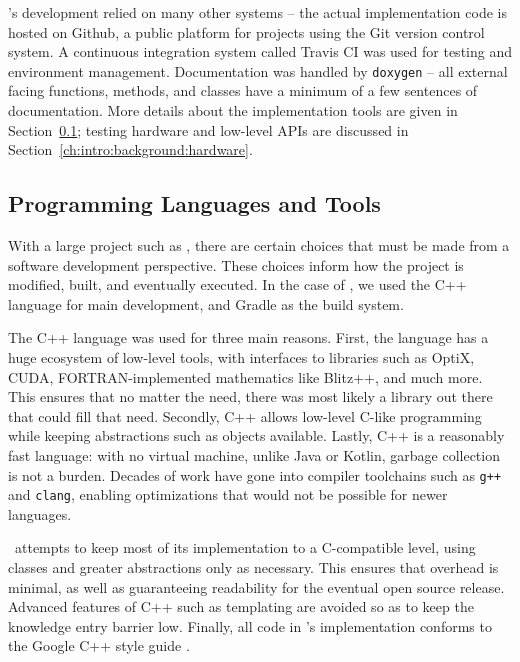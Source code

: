 \name's development relied on many other systems -- the actual implementation code is hosted on Github, a public platform for projects using the Git version control system.
A continuous integration system called Travis CI \cite{travisci} was used for testing and environment management.
Documentation was handled by \texttt{doxygen} \cite{van2008doxygen} -- all external facing functions, methods, and classes have a minimum of a few sentences of documentation.
More details about the implementation tools are given in Section~\ref{ch:intro:background:languages_and_libraries}; testing hardware and low-level APIs are discussed in Section~\ref{ch:intro:background:hardware}.

\subsection{Programming Languages and Tools}
\label{ch:intro:background:languages_and_libraries}

With a large project such as \name, there are certain choices that must be made from a software development perspective.
These choices inform how the project is modified, built, and eventually executed.
In the case of \name, we used the C++ language \cite{cpp14standard} for main development, and Gradle \cite{gradle} as the build system.


The C++ language was used for three main reasons.
First, the language has a huge ecosystem of low-level tools, with interfaces to libraries such as OptiX, CUDA, FORTRAN-implemented mathematics like Blitz++, and much more.
This ensures that no matter the need, there was most likely a library out there that could fill that need.
Secondly, C++ allows low-level C-like programming while keeping abstractions such as objects available.
Lastly, C++ is a reasonably fast language: with no virtual machine, unlike Java or Kotlin, garbage collection is not a burden.
Decades of work have gone into compiler toolchains such as \texttt{g++} and \texttt{clang}, enabling optimizations that would not be possible for newer languages.

\name\ attempts to keep most of its implementation to a C-compatible level, using classes and greater abstractions only as necessary.
This ensures that overhead is minimal, as well as guaranteeing readability for the eventual open source release.
Advanced features of C++ such as templating are avoided so as to keep the knowledge entry barrier low.
Finally, all code in \name's implementation conforms to the Google C++ style guide \cite{googleStyleGuide}.


